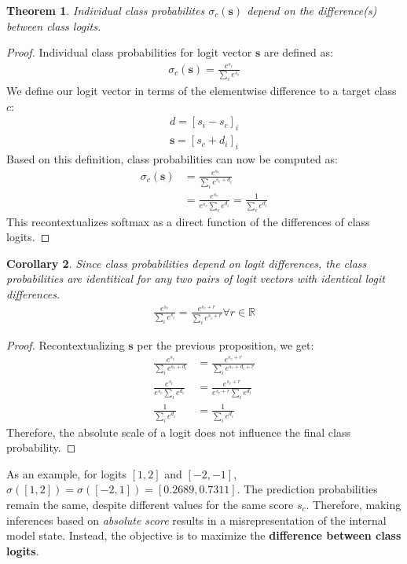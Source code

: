 \documentclass{article}
\theoremstyle{plain}
\newtheorem{theorem}{Theorem}[section]
\newtheorem{corollary}[theorem]{Corollary}
\theoremstyle{definition}
\theoremstyle{remark}
\begin{document}
\begin{theorem}\label{classprobdiff}
	Individual class probabilites $\sigma_c(\bm{s})$ depend on the difference(s) between class logits.
\end{theorem}
\begin{proof} Individual class probabilities for logit vector $\bm{s}$ are defined as:
	\begin{gather}
		\sigma_c(\bm{s}) = \frac{e^{s_c}}{\sum_i e^{s_i}}
	\end{gather}
	We define our logit vector in terms of the elementwise difference to a target class $c$:
	\begin{gather}
		d = [s_i - s_c]_i \\
		\bm{s} = [s_c + d_i]_i
	\end{gather}
	Based on this definition, class probabilities can now be computed as:
	\begin{align}
		\sigma_c(\bm{s}) &= \frac{e^{s_c}}{\sum_i e^{s_c+d_i}} \\
				 &= \frac{e^{s_c}}{e^{s_c} \sum_i e^{d_i}} = \frac{1}{\sum_i e^{d_i}}
	\end{align}
	This recontextualizes softmax as a direct function of the differences of class logits.
\end{proof}
\begin{corollary} Since class probabilities depend on logit differences, the class probabilities are identitical for any two pairs of logit vectors with identical logit differences.
	\begin{gather}
		\frac{e^{s_c}}{\sum_i e^{s_i}} = \frac{e^{s_c+r}}{\sum_i e^{s_i+r}} \forall r \in \mathbb{R}
	\end{gather}
\end{corollary}
\begin{proof} Recontextualizing $\bm{s}$ per the previous proposition, we get:
	\begin{align}
		\frac{e^{s_c}}{\sum_i e^{s_c + d_i}} &= \frac{e^{s_c+r}}{\sum_i e^{s_c+d_i+r}} \\
		\frac{e^{s_c}}{e^{s_c}\sum_i e^{d_i}} &= \frac{e^{s_c+r}}{e^{s_c + r} \sum_i e^{d_i}} \\
		\frac{1}{\sum_i e^{d_i}} &= \frac{1}{\sum_i e^{d_i}}
	\end{align}
	Therefore, the absolute scale of a logit does not influence the final class probability.
\end{proof}

As an example, for logits $[1,2]$ and $[-2,-1]$, $\sigma([1,2]) = \sigma([-2,1]) = [0.2689, 0.7311]$. The prediction probabilities remain the same, despite different values for the same score $s_c$. Therefore, making inferences based on \textit{absolute score} results in a misrepresentation of the internal model state. Instead, the objective is to maximize the \textbf{difference between class logits}.
\end{document}
